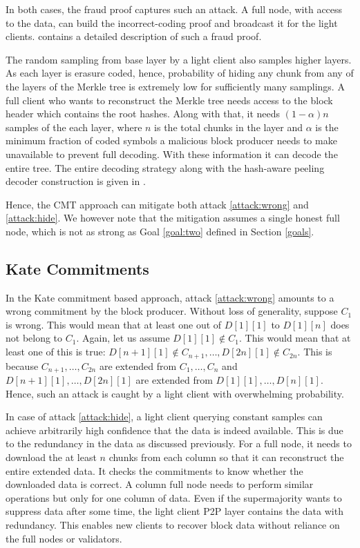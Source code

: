 \documentclass[sigconf, screen=true, nonacm]{acmart}
\begin{document}
        In both cases, the fraud proof captures such an attack. A full node, with access to the data, can build the incorrect-coding proof and broadcast it for the light clients. \cite{yu2019coded} contains a detailed description of such a fraud proof. 

        The random sampling from base layer by a light client also samples higher layers. As each layer is erasure coded, hence, probability of hiding any chunk from any of the layers of the Merkle tree is extremely low for sufficiently many samplings. A full client who wants to reconstruct the Merkle tree needs access to the block header which contains the root hashes. Along with that, it needs $(1-\alpha)n$ samples of the each layer, where $n$ is the total chunks in the layer and $\alpha$ is the minimum fraction of coded symbols a malicious block producer needs to make unavailable to prevent full decoding. With these information it can decode the entire tree. The entire decoding strategy along with the hash-aware peeling decoder construction is given in \cite{yu2019coded}. 

        Hence, the CMT approach can mitigate both attack \ref{attack:wrong} and \ref{attack:hide}.  We however note that the mitigation assumes a single honest full node, which is not as strong as Goal \ref{goal:two} defined in Section \ref{goals}. 

    \subsection{Kate Commitments}
        In the Kate commitment based approach, attack \ref{attack:wrong} amounts to a wrong commitment by the block producer. Without loss of generality, suppose $C_1$ is wrong. This would mean that at least one out of $D[1][1]$ to $D[1][n]$ does not belong to $C_1$. Again, let us assume $D[1][1] \not\in C_1$. This would mean that at least one of this is true: $D[n+1][1] \not\in C_{n+1}, \dots, D[2n][1] \not\in C_{2n}$. This is because $C_{n+1}, \dots, C_{2n}$ are extended from $C_1, \dots, C_n$ and $D[n+1][1], \dots, D[2n][1]$ are extended from $D[1][1], \dots, D[n][1]$. Hence, such an attack is caught by a light client with overwhelming probability. 

        In case of attack \ref{attack:hide}, a light client querying constant samples can achieve arbitrarily high confidence that the data is indeed available. This is due to the redundancy in the data as discussed previously. For a full node, it needs to download the at least $n$ chunks from each column so that it can reconstruct the entire extended data. It checks the commitments to know whether the downloaded data is correct. A column full node needs to perform similar operations but only for one column of data. Even if the supermajority wants to suppress data after some time, the light client P2P layer contains the data with redundancy. This enables new clients to recover block data without reliance on the full nodes or validators. 
        
\end{document}
